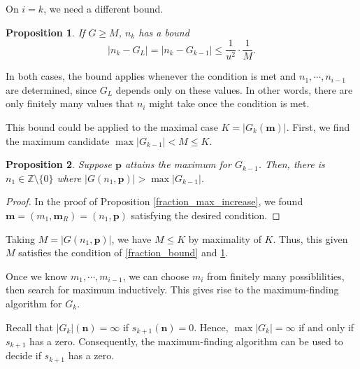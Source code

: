 \documentclass{article}
\theoremstyle{definition}
\theoremstyle{plain}
\newtheorem{proposition}{Proposition}[section]
\theoremstyle{remark}
\numberwithin{equation}{section}
\newcommand{\integer}{\mathbb{Z}}
\newcommand{\abs}[1]{\left\lvert{#1}\right\rvert}
\begin{document}
On $i = k$, we need a different bound.

\begin{proposition}\label{fraction_bound_last}
  If $G \geq M$, $n_k$ has a bound
  \[ \abs{n_k - G_L} = \abs{n_k - G_{k-1}} \leq \frac{1}{u^2} \cdot \frac{1}{M}. \]
\end{proposition}

In both cases, the bound applies whenever the condition is met and $n_1, \cdots, n_{i-1}$ are determined,
since $G_L$ depends only on these values.
In other words, there are only finitely many values that $n_i$ might take once the condition is met.

This bound could be applied to the maximal case $K = \abs{G_k(\mathbf{m})}$.
First, we find the maximum candidate $\max \abs{G_{k-1}} < M \leq K$.

\begin{proposition}
  Suppose $\mathbf{p}$ attains the maximum for $G_{k-1}$.
  Then, there is $n_1 \in \integer \setminus \{ 0 \}$ where $\abs{G(n_1, \mathbf{p})} > \max \abs{G_{k-1}}$.
\end{proposition}
\begin{proof}
  In the proof of Proposition \ref{fraction_max_increase},
  we found $\mathbf{m} = (m_1, \mathbf{m}_R) = (n_1, \mathbf{p})$
  satisfying the desired condition.
\end{proof}

Taking $M = \abs{G(n_1, \mathbf{p})}$, we have $M \leq K$ by maximality of $K$.
Thus, this given $M$ satisfies the condition of \ref{fraction_bound} and \ref{fraction_bound_last}.

Once we know $m_1, \cdots, m_{i-1}$,
we can choose $m_i$ from finitely many possiblilities, then search for maximum inductively.
This gives rise to the maximum-finding algorithm for $G_k$.

Recall that $\abs{G_k}(\mathbf{n}) = \infty$ if $s_{k+1}(\mathbf{n}) = 0$.
Hence, $\max \abs{G_k} = \infty$ if and only if $s_{k+1}$ has a zero.
Consequently, the maximum-finding algorithm can be used to decide if $s_{k+1}$ has a zero.
\end{document}
